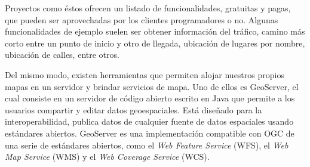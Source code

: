 Proyectos como éstos ofrecen un listado de funcionalidades, gratuitas y pagas, que pueden ser aprovechadas por los clientes programadores o no. Algunas funcionalidades de ejemplo suelen ser obtener información del tráfico, camino más corto entre un punto de inicio y otro de llegada, ubicación de lugares por nombre, ubicación de calles, entre otros.

Del mismo modo, existen herramientas que permiten alojar nuestros propios mapas en un servidor y brindar servicios de mapa. Uno de ellos es GeoServer, el cual consiste en un servidor de código abierto escrito en Java que permite a los usuarios compartir y editar datos geoespaciales. Está diseñado para la interoperabilidad, publica datos de cualquier fuente de datos espaciales usando estándares abiertos. GeoServer es una implementación compatible con OGC de una serie de estándares abiertos, como el \textit{Web Feature Service} (WFS), el \textit{Web Map Service} (WMS) y el \textit{Web Coverage Service} (WCS).